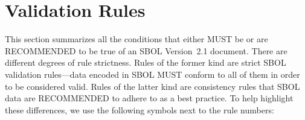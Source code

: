 \newcommand{\printValid}{\validRule{sbol-\arabic{sbolCtr}\addtocounter{sbolCtr}{1}}}
\newcommand{\printComplete}{\completeRule{sbol-\arabic{sbolCtr}\addtocounter{sbolCtr}{1}}}
\newcommand{\printWarning}{\consistencyRule{sbol-\arabic{sbolCtr}\addtocounter{sbolCtr}{1}}}
\newcommand{\printModeling}{\modelingRule{sbol-\arabic{sbolCtr}\addtocounter{sbolCtr}{1}}}

\section{Validation Rules}
\label{validation}

This section summarizes all the conditions that either MUST be or 
are RECOMMENDED to be true of an SBOL Version~2.1 document. There are different degrees of rule strictness.  
Rules of the former kind are strict SBOL validation rules---data encoded in SBOL MUST conform to
all of them in order to be considered valid. Rules of the latter kind
are consistency rules that SBOL data are RECOMMENDED to adhere to as a best practice.  To help highlight these differences, we use the
following symbols next to the rule numbers:


